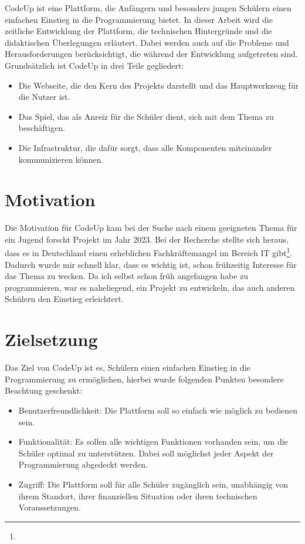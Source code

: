 \documentclass[main.tex]{subfiles}
\begin{document}
    CodeUp ist eine Plattform, die Anfängern und besonders jungen Schülern einen einfachen Einstieg in die Programmierung bietet.
    In dieser Arbeit wird die zeitliche Entwicklung der Plattform, die technischen Hintergründe und die didaktischen Überlegungen erläutert.
    Dabei werden auch auf die Probleme und Herausforderungen berücksichtigt, die während der Entwicklung aufgetreten sind.
    Grundsätzlich ist CodeUp in drei Teile gegliedert:
    \begin{itemize}
        \item Die Webseite, die den Kern des Projekts darstellt und das Hauptwerkzeug für die Nutzer ist.
        \item Das Spiel, das als Anreiz für die Schüler dient, sich mit dem Thema zu beschäftigen.
        \item Die Infrastruktur, die dafür sorgt, dass alle Komponenten miteinander kommunizieren können.
    \end{itemize}
    \section{Motivation}
    Die Motivation für CodeUp kam bei der Suche nach einem geeigneten Thema für ein Jugend forscht Projekt im Jahr 2023.
    Bei der Recherche stellte sich heraus, dass es in Deutschland einen erheblichen Fachkräftemangel im Bereich IT gibt\footnote{}.
    Dadurch wurde mir schnell klar, dass es wichtig ist, schon frühzeitig Interesse für das Thema zu wecken.
    Da ich selbst schon früh angefangen habe zu programmieren, war es naheliegend, ein Projekt zu entwickeln, das auch anderen Schülern den Einstieg erleichtert.
    \section{Zielsetzung}
    Das Ziel von CodeUp ist es, Schülern einen einfachen Einstieg in die Programmierung zu ermöglichen, hierbei wurde folgenden Punkten besondere Beachtung geschenkt:
    \begin{itemize}
        \item Benutzerfreundlichkeit: Die Plattform soll so einfach wie möglich zu bedienen sein.
        \item Funktionalität: Es sollen alle wichtigen Funktionen vorhanden sein, um die Schüler optimal zu unterstützen.
        Dabei soll möglichst jeder Aspekt der Programmierung abgedeckt werden.
        \item Zugriff: Die Plattform soll für alle Schüler zugänglich sein, unabhängig von ihrem Standort, ihrer finanziellen Situation oder ihren technischen Voraussetzungen.
    \end{itemize}
\end{document}
